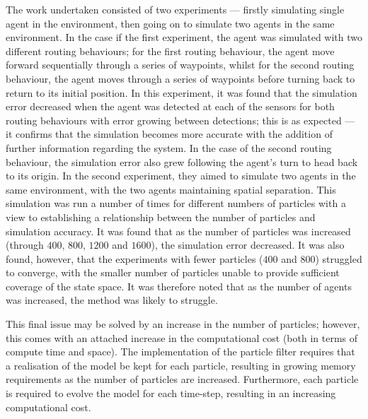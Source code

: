 The work undertaken consisted of two experiments --- firstly simulating single
agent in the environment, then going on to simulate two agents in the same
environment.
In the case if the first experiment, the agent was simulated with two different
routing behaviours; for the first routing behaviour, the agent move forward
sequentially through a series of waypoints, whilst for the second routing
behaviour, the agent moves through a series of waypoints before turning back to
return to its initial position.
In this experiment, it was found that the simulation error decreased when the
agent was detected at each of the sensors for both routing behaviours with error
growing between detections; this is as expected --- it confirms that the
simulation becomes more accurate with the addition of further information
regarding the system.
In the case of the second routing behaviour, the simulation error also grew
following the agent's turn to head back to its origin.
In the second experiment, they aimed to simulate two agents in the same
environment, with the two agents maintaining spatial separation.
This simulation was run a number of times for different numbers of particles
with a view to establishing a relationship between the number of particles and
simulation accuracy.
It was found that as the number of particles was increased (through $400$,
$800$, $1200$ and $1600$), the simulation error decreased.
It was also found, however, that the experiments with fewer particles ($400$ and
$800$) struggled to converge, with the smaller number of particles unable to
provide sufficient coverage of the state space.
It was therefore noted that as the number of agents was increased, the method
was likely to struggle.

This final issue may be solved by an increase in the number of particles;
however, this comes with an attached increase  in the computational cost (both
in terms of compute time and space).
The implementation of the particle filter requires that a realisation of the
model be kept for each particle, resulting in growing memory requirements as
the number of particles are increased.
Furthermore, each particle is required to evolve the model for each time-step,
resulting in an increasing computational cost.

